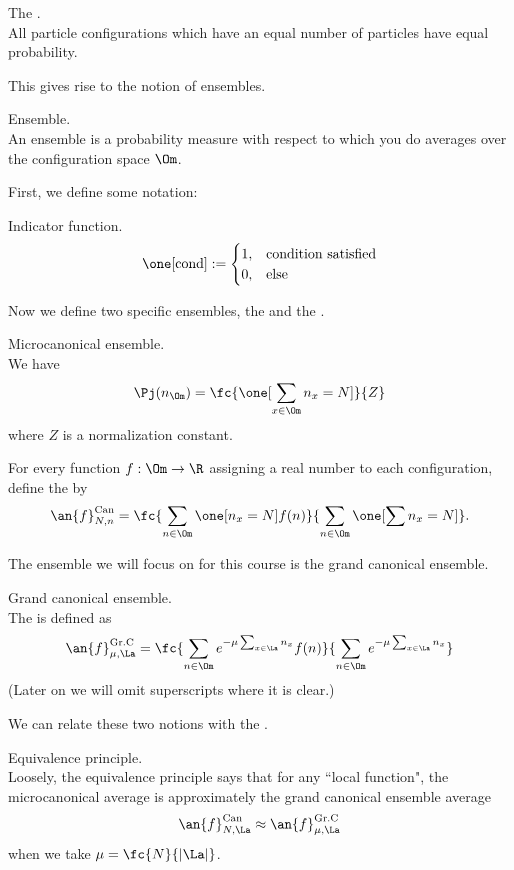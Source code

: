 \begin{df} The . \\
All particle configurations which have an equal number of particles have equal probability.
\end{df}

This gives rise to the notion of ensembles. 
\begin{df} Ensemble. \\
An ensemble is a probability measure with respect to which you do averages over the configuration space $\Om$. 
\end{df} 
First, we define some notation: 
\begin{df} Indicator function. \\
\[
\one[\text{cond}] := \begin{cases}
1,&\text{condition satisfied}\\
0,&\text{else}
\end{cases}
\]
\end{df}
Now we define two specific ensembles, the  and the . 

\begin{df} Microcanonical ensemble. \\
We have
\[
\Pj(n_{\Om})= \fc{\one[\sum_{x\in \Om}n_x=N]}{Z}
\]
where $Z$ is a normalization constant.

For every function $f:\Om\to \R$ assigning a real number to each configuration, define the  by
\[
\an{f}_{N,n}^{\text{Can}} = \fc{\sum_{n\in \Om} \one[n_x=N] f(n)}{\sum_{n\in \Om} \one[\sum n_x=N]}.
\]
\end{df}

The ensemble we will focus on for this course is the grand canonical ensemble. 

\begin{df} Grand canonical ensemble. \\
The  is defined as
\[
\an{f}_{\mu, \La}^{\text{Gr.C}} = \fc{\sum_{n\in \Om} e^{-\mu  \sum_{x\in \La}n_x}f(n)}{\sum_{n\in \Om}e^{-\mu \sum_{x\in \La} n_x}}
\]
(Later on we will omit superscripts where it is clear.)
\end{df}

We can relate these two notions with the . 

\begin{df} Equivalence principle. \\
Loosely, the equivalence principle says that for any ``local function", the microcanonical average is approximately the grand canonical ensemble average
\[
\an{f}_{N,\La}^{\text{Can}}\approx \an{f}_{\mu, \La}^{\text{Gr.C}}
\] 
when we take $\mu = \fc{N}{|\La|}$.
\end{df}



